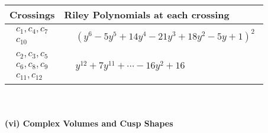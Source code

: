\documentclass[1p]{elsarticle_modified}
\theoremstyle{definition}
\begin{document}
\begin{tabular}{m{50pt}|m{274pt}}
Crossings & \hspace{64pt}Riley Polynomials at each crossing \\
\hline $$\begin{aligned}c_{1},c_{4},c_{7}\\c_{10}\end{aligned}$$&$\begin{aligned}
&(y^6-5 y^5+14 y^4-21 y^3+18 y^2-5 y+1)^2
\end{aligned}$\\
\hline $$\begin{aligned}c_{2},c_{3},c_{5}\\c_{6},c_{8},c_{9}\\c_{11},c_{12}\end{aligned}$$&$\begin{aligned}
&y^{12}+7 y^{11}+\cdots-16 y^2+16
\end{aligned}$\\
\hline
\end{tabular}\\~\\
\newpage\flushleft \textbf{(vi) Complex Volumes and Cusp Shapes}
\end{document}
